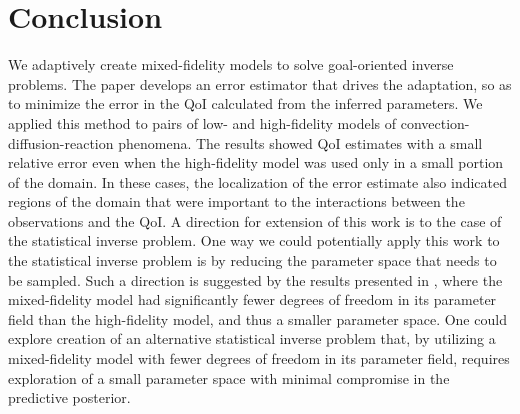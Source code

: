 \documentclass[review]{siamart0516}
\providecommand{\DIFaddbegin}{} %
\providecommand{\DIFdelbegin}{} %
\providecommand{\DIFdelend}{} %
\newcommand{\DIFscaledelfig}{0.5}
\newlength{\DIFdelgraphicswidth} %
\newlength{\DIFdelgraphicsheight} %
\newcommand{\DIFaddincludegraphics}[2][]{{\color{blue}\fbox{\DIFOincludegraphics[#1]{#2}}}} %
\newcommand{\DIFdelincludegraphics}[2][]{%
\sbox{\DIFdelgraphicsbox}{\DIFOincludegraphics[#1]{#2}}%
\settoboxwidth{\DIFdelgraphicswidth}{\DIFdelgraphicsbox} %
\settoboxtotalheight{\DIFdelgraphicsheight}{\DIFdelgraphicsbox} %
\scalebox{\DIFscaledelfig}{%
\parbox[b]{\DIFdelgraphicswidth}{\usebox{\DIFdelgraphicsbox}\\[-\baselineskip] \rule{\DIFdelgraphicswidth}{0em}}\llap{\resizebox{\DIFdelgraphicswidth}{\DIFdelgraphicsheight}{%
\setlength{\unitlength}{\DIFdelgraphicswidth}%
\begin{picture}(1,1)%
\thicklines\linethickness{2pt} %
{\color[rgb]{1,0,0}\put(0,0){\framebox(1,1){}}}%
{\color[rgb]{1,0,0}\put(0,0){\line( 1,1){1}}}%
{\color[rgb]{1,0,0}\put(0,1){\line(1,-1){1}}}%
\end{picture}%
}\hspace*{3pt}}} %
} %
\DeclareRobustCommand{\DIFaddbegin}{\DIFOaddbegin \let\includegraphics\DIFaddincludegraphics} %
\DeclareRobustCommand{\DIFdelbegin}{\DIFOdelbegin \let\includegraphics\DIFdelincludegraphics} %
\DeclareRobustCommand{\DIFdelend}{\DIFOaddend \let\includegraphics\DIFOincludegraphics} %
\begin{document}
\DIFdelbegin %

\DIFdelend \section{Conclusion}\label{sec:conc}

We adaptively create mixed-fidelity models to solve goal-oriented inverse problems. The paper develops an error estimator that drives the adaptation, so as to minimize the error in the QoI calculated from the inferred parameters. We applied this method to pairs of low- and high-fidelity models of convection-diffusion-reaction phenomena. The results showed QoI estimates with a small relative error even when the high-fidelity model was used only in a small portion of the domain. In these cases, the localization of the error estimate also indicated regions of the domain that were important to the interactions between the observations and the QoI. A direction for extension of this work is to the case of the statistical inverse problem.  One way we could potentially apply this work to the statistical inverse problem is by reducing the parameter space that needs to be sampled. Such a direction is suggested by the results presented in , where the mixed-fidelity model had significantly fewer degrees of freedom in its parameter field than the high-fidelity model, and thus a smaller parameter space. One could explore creation of an alternative statistical inverse problem that, by utilizing a mixed-fidelity model with fewer degrees of freedom in its parameter field, requires exploration of a small parameter space with minimal compromise in the predictive posterior.
\DIFaddbegin 
\end{document}
